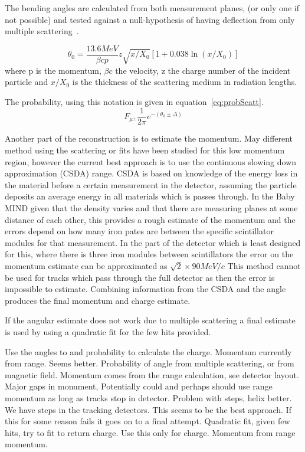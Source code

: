 The bending angles are calculated from both measurement planes, (or only one if not possible) and tested against a null-hypothesis of having deflection from only multiple scattering~\cite{13PDG}.

\begin{equation}
\theta_0 = \frac{13.6 MeV}{\beta cp} z \sqrt{x/X_0}[1+0.038\ln(x/X_0)]
\end{equation}
where p is the momentum, $\beta c$ the velocity, z the charge number of the incident particle and $x/X_0$ is the thickness of the scattering medium in radiation lengths.

The probability, using this notation is given in equation~\ref{eq:probScatt}.
\begin{equation}
F_{\mu^\pm} \frac{1}{2\pi} e ^ {-( \theta_0 \pm \Delta)}
\label{eq:probScatt}
\end{equation}

Another part of the reconstruction is to estimate the momentum. May different method using the scattering or fits have been studied for this low momentum region, however the current best approach is to use the continuous slowing down approximation (CSDA) range.
CSDA is based on knowledge of the energy loss in the material before a certain measurement in the detector, assuming the particle deposits an average energy in all materials which is passes through. In the Baby MIND given that the density varies and that there are measuring planes at some distance of each other, this provides a rough estimate of the momentum and the errors depend on how many iron pates are between the specific scintillator modules for that measurement. In the part of the detector which is least designed for this, where there is three iron modules between scintillators the error on the momentum estimate can be approximated as $\sqrt{2} \times 90 MeV/c$ This method cannot be used for tracks which pass through the full detector as then the error is impossible to estimate. Combining information from the CSDA and the angle produces the final momentum and charge estimate.

If the angular estimate does not work due to multiple scattering a final estimate is used by using a quadratic fit for the few hits provided.

Use the angles to and probability to calculate the charge. Momentum currently from range. Seems better.
Probability of angle from multiple scattering, or from magnetic field. 
Momentum comes from the range calculation, see detector layout. Major gaps in monument,  Potentially could and perhaps should use range momentum as long as tracks stop in detector. Problem with steps, helix better.
We have steps in the tracking detectors.
This seems to be the best approach. If this for some reason fails it goes on to a final attempt.
Quadratic fit, given few hits, try to fit to return charge. Use this only for charge. Momentum from range momentum.
\fi

